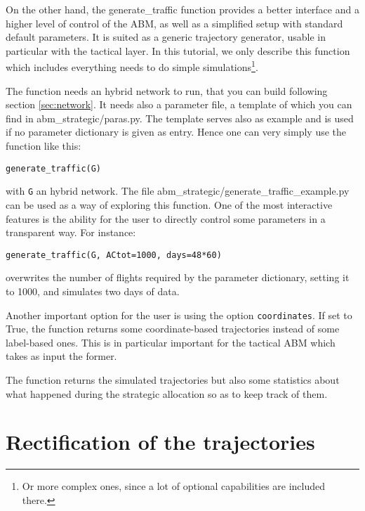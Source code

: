 \documentclass[12pt]{article}
\begin{document}
On the other hand, the generate\_traffic function provides a better interface and a higher level of control of the ABM, as well as a simplified setup with standard default parameters. It is suited as a generic trajectory generator, usable in particular with the tactical layer. In this tutorial, we only describe this function which includes everything needs to do simple simulations\footnote{Or more complex ones, since a lot of optional capabilities are included there.}.

The function needs an hybrid network to run, that you can build following section \ref{sec:network}. It needs also a parameter file, a template of which you can find in abm\_strategic/paras.py. The template serves also as example and is used if no parameter dictionary is given as entry. Hence one can very simply use the function like this:
\begin{verbatim}
generate_traffic(G)
\end{verbatim}
with \verb|G| an hybrid network. The file abm\_strategic/generate\_traffic\_example.py can be used as a way of exploring this function. One of the most interactive features is the ability for the user to directly control some parameters in a transparent way. For instance:
\begin{verbatim}
generate_traffic(G, ACtot=1000, days=48*60)
\end{verbatim}
overwrites the number of flights required by the parameter dictionary, setting it to 1000, and simulates two days of data.

Another important option for the user is using the option \verb|coordinates|. If set to True, the function returns some coordinate-based trajectories instead of some label-based ones. This is in particular important for the tactical ABM which takes as input the former.

The function returns the simulated trajectories but also some statistics about what happened during the strategic allocation so as to keep track of them.

\section{Rectification of the trajectories}
\label{sec:rectification}
\end{document}

